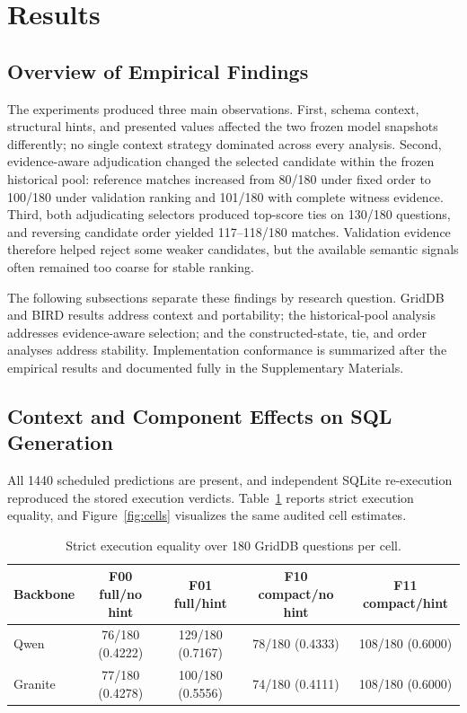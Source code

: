 \documentclass[applsci,article,submit,moreauthors]{Definitions/mdpi}
\begin{document}
\section{Results}

\subsection{Overview of Empirical Findings}

The experiments produced three main observations. First, schema context, structural hints, and presented values affected the two frozen model snapshots differently; no single context strategy dominated across every analysis. Second, evidence-aware adjudication changed the selected candidate within the frozen historical pool: reference matches increased from 80/180 under fixed order to 100/180 under validation ranking and 101/180 with complete witness evidence. Third, both adjudicating selectors produced top-score ties on 130/180 questions, and reversing candidate order yielded 117--118/180 matches. Validation evidence therefore helped reject some weaker candidates, but the available semantic signals often remained too coarse for stable ranking.

The following subsections separate these findings by research question. GridDB and BIRD results address context and portability; the historical-pool analysis addresses evidence-aware selection; and the constructed-state, tie, and order analyses address stability. Implementation conformance is summarized after the empirical results and documented fully in the Supplementary Materials.

\subsection{Context and Component Effects on SQL Generation}

All 1440 scheduled predictions are present, and independent SQLite re-execution reproduced the stored execution verdicts. Table~\ref{tab:cells} reports strict execution equality, and Figure~\ref{fig:cells} visualizes the same audited cell estimates.

\begin{table}[htbp]
\caption{Strict execution equality over 180 GridDB questions per cell.}
\label{tab:cells}
\centering
\small
\setlength{\tabcolsep}{4pt}
\begin{tabular}{lcccc}
\toprule
Backbone & F00 full/no hint & F01 full/hint & F10 compact/no hint & F11 compact/hint\\
\midrule
Qwen & 76/180 (0.4222) & 129/180 (0.7167) & 78/180 (0.4333) & 108/180 (0.6000)\\
Granite & 77/180 (0.4278) & 100/180 (0.5556) & 74/180 (0.4111) & 108/180 (0.6000)\\
\bottomrule
\end{tabular}
\end{table}
\end{document}
